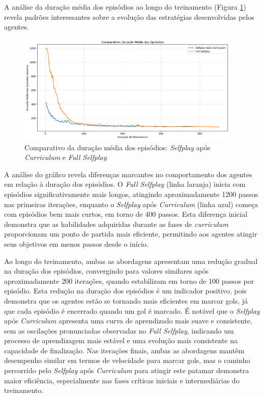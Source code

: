A análise da duração média dos episódios ao longo do treinamento (Figura \ref{fig:episode_len}) revela padrões interessantes sobre a evolução das estratégias desenvolvidas pelos agentes.

\begin{figure}[H]
    \centering
    \includegraphics[width=0.95\textwidth]{fig/graficos_trabalho/graficos_experimentos/geral/comparativo_duracao_episodios.png}
    \caption{Comparativo da duração média dos episódios: \textit{Selfplay} após \textit{Curriculum} e \textit{Full Selfplay}}
    \label{fig:episode_len}
\end{figure}

A análise do gráfico revela diferenças marcantes no comportamento dos agentes em relação à duração dos episódios. O \textit{Full Selfplay} (linha laranja) inicia com episódios significativamente mais longos, atingindo aproximadamente 1200 passos nas primeiras iterações, enquanto o \textit{Selfplay} após \textit{Curriculum} (linha azul) começa com episódios bem mais curtos, em torno de 400 passos. Esta diferença inicial demonstra que as habilidades adquiridas durante as fases de \textit{curriculum} proporcionam um ponto de partida mais eficiente, permitindo aos agentes atingir seus objetivos em menos passos desde o início.

Ao longo do treinamento, ambas as abordagens apresentam uma redução gradual na duração dos episódios, convergindo para valores similares após aproximadamente 200 iterações, quando estabilizam em torno de 100 passos por episódio. Esta redução na duração dos episódios é um indicador positivo, pois demonstra que os agentes estão se tornando mais eficientes em marcar gols, já que cada episódio é encerrado quando um gol é marcado. É notável que o \textit{Selfplay} após \textit{Curriculum} apresenta uma curva de aprendizado mais suave e consistente, sem as oscilações pronunciadas observadas no \textit{Full Selfplay}, indicando um processo de aprendizagem mais estável e uma evolução mais consistente na capacidade de finalização. Nas iterações finais, ambas as abordagens mantêm desempenho similar em termos de velocidade para marcar gols, mas o caminho percorrido pelo \textit{Selfplay} após \textit{Curriculum} para atingir este patamar demonstra maior eficiência, especialmente nas fases críticas iniciais e intermediárias do treinamento.

